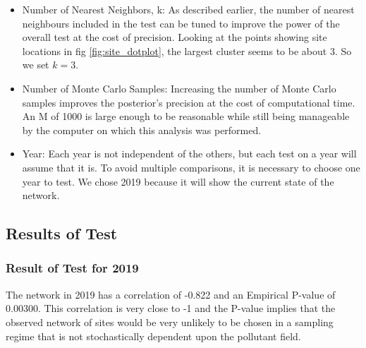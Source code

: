 \documentclass{article}
\begin{document}
\begin{itemize}
	\item Number of Nearest Neighbors, \gls{k}:
	As described earlier, the number of nearest neighbours included in the test can be tuned to improve the power of the overall test at the cost of precision.  Looking at the points showing site locations in fig \ref{fig:site_dotplot}, the largest cluster seems to be about 3.  So we set $k = 3$.  
	
	\item Number of Monte Carlo Samples:
	Increasing the number of Monte Carlo samples improves the posterior's precision at the cost of computational time.  An M of 1000 is large enough to be reasonable while still being manageable by the computer on which this analysis was performed.
	\item Year:
	Each year is not independent of the others, but each test on a year will assume that it is.  To avoid multiple comparisons, it is necessary to choose one year to test.  We chose 2019 because it will show the current state of the network.
	
\end{itemize}


\subsection{Results of Test}
\label{subsec:testresults}

\subsubsection*{Result of Test for 2019}
\label{subsubsec:test2019}


The network in 2019 has a correlation of -0.822 and an Empirical P-value of 0.00300. 
This correlation is very close to -1 and the P-value implies that the observed network of sites would be very unlikely to be chosen in a sampling regime that is not stochastically dependent upon the pollutant field.  
\end{document}
